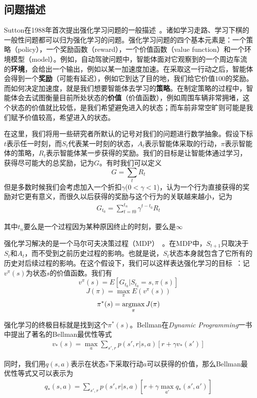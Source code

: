   \subsection{问题描述}
    Sutton在1988年首次提出强化学习问题的一般描述~\cite{Sutton_problem_formulation}。诸如学习走路、学习下棋的一般性问题都可以归为强化学习的问题。强化学习问题的四个基本元素是：一个策略（policy），一个奖励函数（reward），一个价值函数（value function）和一个环境模型（model）。例如，自动驾驶问题中，智能体面对它观察到的一个周边车流的\textbf{环境}，会给出一个输出，例如以某一加速度加速。在采取这一行动之后，智能体会得到一个\textbf{奖励}（可能有延迟），例如它到达了目的地，我们给它价值$100$的奖励。而如何决定加速度，就是我们想要智能体去学习的\textbf{策略}。在制定策略的过程中，智能体会去试图衡量目前所处状态的\textbf{价值}（价值函数），例如周围车辆非常拥堵，这个状态的价值就比较低，是我们希望避免进入的状态；而车前非常空旷则可能是我们赋予价值较高，希望进入的状态。\par
    在这里，我们将用一些研究者所默认的记号对我们的问题进行数学抽象。假设下标$t$表示任一时刻，而$S_t$代表某一时刻的状态，$A_t$表示智能体采取的行动，$\pi$表示智能体的策略，$R_t$表示智能体某一步获得的奖励。我们的目标是让智能体通过学习，获得尽可能大的总奖励，记为$G$。有时我们可以定义
      $$ G = \sum_{t} R_t $$
    但是多数时候我们会考虑加入一个折扣$\gamma$($0 < \gamma < 1$)，认为一个行为直接获得的奖励对它更有意义，而很久以后获得的奖励与这个行为的关联越来越小，记为
      \begin{align}
        G_{t_0} = \sum_{t = t0}^{t_n} \gamma^{t-t_0} R_t
        \label{eq:G}
      \end{align}
    \par 其中$t_n$要么是一个过程因为某种原因终止的时刻，要么是$\infty$
    \par
    强化学习解决的是一个马尔可夫决策过程（MDP）~\cite{Bellman_MDP}。在MDP中，$S_{t+1}$只取决于$S_t$和$A_t$，而不受到之前历史过程的影响。也就是说，$S_t$状态本身就包含了它所有的历史对后续过程的影响。在这个假设下，我们可以这样表达强化学习的目标~\cite{DRL_for_driving}：记$v^{\pi}(s)$为状态$s$的价值函数。我们有$$ v^{\pi}(s) = E[G_{t_0} | S_{t_0} = s, \pi(s) ] $$
      $$ J(\pi) = \max_{\pi} E(v^{\pi}(s)) $$
      $$ \pi^*(s) = \operatorname*{argmax}_{\pi} J(\pi) $$
    \par 强化学习的终极目标就是找到这个$\pi^*(s)$。Bellman在\textit{Dynamic Programming}一书中提出了著名的Bellman最优性等式~\cite{Bellman_DP}
    \begin{align}
       v_*(s) = \max_{a} \sum_{s', r}p(s', r | s, a)[r + \gamma v_*(s')]
    \end{align}
    \par 同时，我们用$q(s, a)$表示在状态$s$下采取行动$a$可以获得的价值，那么Bellman最优性等式又可以表示为
    \begin{align}
       q_*(s, a) = \sum_{s', r}p(s', r | s, a)[r + \gamma \max_{a'} q_*(s', a')]
    \end{align}

